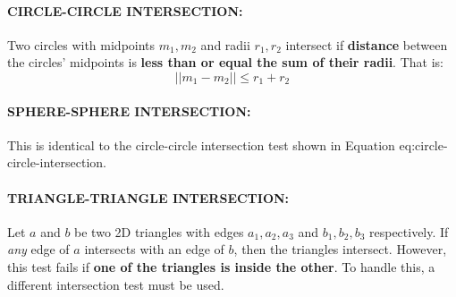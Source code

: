 \documentclass{article}
\begin{document}
\paragraph{}

\paragraph{{CIRCLE-CIRCLE INTERSECTION: }} Two circles with midpoints $m_1,m_2$ and radii $r_1,r_2$ intersect if \textbf{distance} between the circles' midpoints is \textbf{less than or equal the sum of their radii}. That is:
\begin{equation}
	||m_1 - m_2|| \leq r_1 + r_2
\label{eq:circle-circle-intersection}
\end{equation} 
\paragraph{}

\paragraph{{SPHERE-SPHERE INTERSECTION: }} This is identical to the circle-circle intersection test shown in Equation {eq:circle-circle-intersection}.
\paragraph{}

\paragraph{{TRIANGLE-TRIANGLE INTERSECTION: }} Let $a$ and $b$ be two 2D triangles with edges $a_1,a_2,a_3$ and $b_1,b_2,b_3$ respectively. If \textit{any} edge of $a$ intersects with an edge of $b$, then the triangles intersect. However, this test fails if \textbf{one of the triangles is inside the other}. To handle this, a different intersection test must be used.
\end{document}
